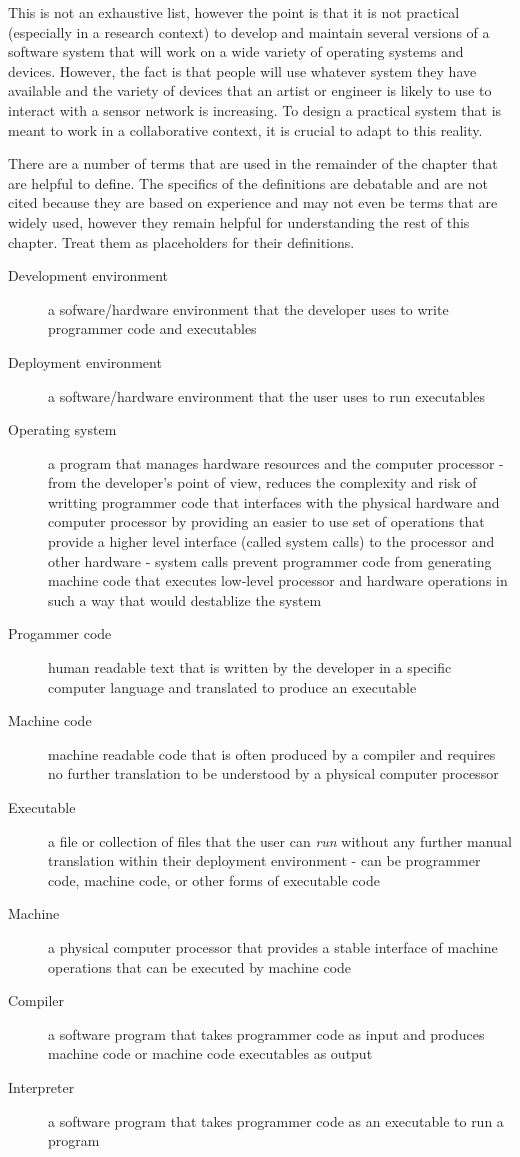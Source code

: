 This is not an exhaustive list, however the point is that it is not practical (especially in a research context) to develop and maintain several versions of a software system that will work on a wide variety of operating systems and devices. However, the fact is that people will use whatever system they have available and the variety of devices that an artist or engineer is likely to use to interact with a sensor network is increasing. To design a practical system that is meant to work in a collaborative context, it is crucial to adapt to this reality.

There are a number of terms that are used in the remainder of the chapter that are helpful to define. The specifics of the definitions are debatable and are not cited because they are based on experience and may not even be terms that are widely used, however they remain helpful for understanding the rest of this chapter. Treat them as placeholders for their definitions.

\begin{description}
\item[Development environment] a sofware/hardware environment that the developer uses to write programmer code and executables
\item[Deployment environment] a software/hardware environment that the user uses to run executables
\item[Operating system] a program that manages hardware resources and the computer processor - from the developer's point of view, reduces the complexity and risk of writting programmer code that interfaces with the physical hardware and computer processor by providing an easier to use set of operations that provide a higher level interface (called system calls) to the processor and other hardware - system calls prevent programmer code from generating machine code that executes low-level processor and hardware operations in such a way that would destablize the system
\item[Progammer code] human readable text that is written by the developer in a specific computer language and translated to produce an executable
\item[Machine code] machine readable code that is often produced by a compiler and requires no further translation to be understood by a physical computer processor
\item[Executable] a file or collection of files that the user can \emph{run} without any further manual translation within their deployment environment - can be programmer code, machine code, or other forms of executable code  
\item[Machine] a physical computer processor that provides a stable interface of machine operations that can be executed by machine code
\item[Compiler] a software program that takes programmer code as input and produces machine code or machine code executables as output
\item[Interpreter] a software program that takes programmer code as an executable to run a program
\end{description}

